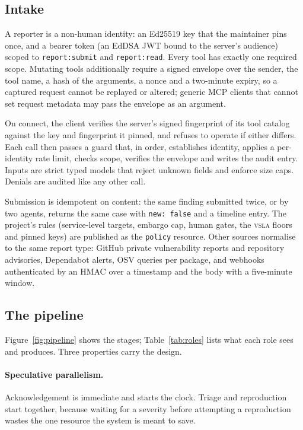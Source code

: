 \documentclass[11pt]{article}
\newcommand{\vsla}{\textsc{vsla}}
\newcommand{\code}[1]{\texttt{\small #1}}
\begin{document}
\subsection{Intake}
\label{sec:intake}

A reporter is a non-human identity: an Ed25519 key that the maintainer pins once, and a bearer token (an EdDSA
JWT bound to the server's audience) scoped to \code{report:submit} and \code{report:read}. Every tool has
exactly one required scope. Mutating tools additionally require a signed envelope over the sender, the tool
name, a hash of the arguments, a nonce and a two-minute expiry, so a captured request cannot be replayed or
altered; generic MCP clients that cannot set request metadata may pass the envelope as an argument.

On connect, the client verifies the server's signed fingerprint of its tool catalog against the key and
fingerprint it pinned, and refuses to operate if either differs. Each call then passes a guard that, in order,
establishes identity, applies a per-identity rate limit, checks scope, verifies the envelope and writes the
audit entry. Inputs are strict typed models that reject unknown fields and enforce size caps. Denials are
audited like any other call.

Submission is idempotent on content: the same finding submitted twice, or by two agents, returns the same case
with \code{new: false} and a timeline entry. The project's rules (service-level targets, embargo cap, human
gates, the \vsla{} floors and pinned keys) are published as the \code{policy} resource. Other sources normalise
to the same report type: GitHub private vulnerability reports and repository advisories, Dependabot alerts, OSV
queries per package, and webhooks authenticated by an HMAC over a timestamp and the body with a five-minute
window.

\subsection{The pipeline}
\label{sec:pipeline}

Figure~\ref{fig:pipeline} shows the stages; Table~\ref{tab:roles} lists what each role sees and produces. Three
properties carry the design.

\paragraph{Speculative parallelism.} Acknowledgement is immediate and starts the clock. Triage and reproduction
start together, because waiting for a severity before attempting a reproduction wastes the one resource the
system is meant to save.
\end{document}

